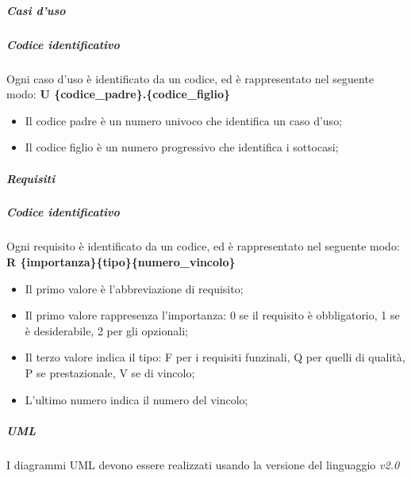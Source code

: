 				\subparagraph{Casi d'uso}
			\subparagraph{Codice identificativo} \Spazio
			Ogni caso d'uso è identificato da un codice, ed è rappresentato nel seguente modo:
			\textbf{U \{codice\_padre\}.\{codice\_figlio\}  }
			
			\begin{itemize}
				\item Il codice padre è un numero univoco che identifica un caso d'uso;
				\item Il codice figlio è un numero progressivo che identifica i sottocasi;
			\end{itemize}
			\subparagraph{Requisiti}
			\subparagraph{Codice identificativo} \Spazio
			Ogni requisito è identificato da un codice, ed è rappresentato nel seguente modo:
			\textbf{R \{importanza\}\{tipo\}\{numero\_vincolo\} }
			
			\begin{itemize}
				\item Il primo valore è l'abbreviazione di requisito;
				\item Il primo valore rappresenza l'importanza: 0 se il requisito è obbligatorio, 1 se è desiderabile, 2 per gli opzionali;
				\item Il terzo valore indica il tipo: F per i requisiti funzinali, Q per quelli di qualità, P se prestazionale, V se di vincolo;
				\item L'ultimo numero indica il numero del vincolo;
			\end{itemize}
			\subparagraph{UML} \Spazio
			I diagrammi UML devono essere realizzati usando la versione del linguaggio \textit{v2.0}
			
			
